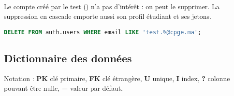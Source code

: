 \begin{alerte}[À nettoyer]
Le compte créé par le test () n'a pas d'intérêt : on peut le supprimer. La suppression en cascade emporte aussi son profil étudiant et ses jetons.
\begin{lstlisting}[numbers=none,language=SQL]
DELETE FROM auth.users WHERE email LIKE 'test.%@cpge.ma';
\end{lstlisting}
\end{alerte}

\subsection{Dictionnaire des données}

Notation : \textbf{PK} clé primaire, \textbf{FK} clé étrangère, \textbf{U} unique, \textbf{I} index, \textbf{?} colonne pouvant être nulle, \textbf{=} valeur par défaut.

